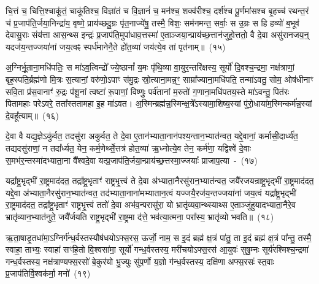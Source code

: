 {\anuvakamend[{यथ्स्वेन॑ सारस्व॒तीमा ल॑भेत॒ यः कामा॑य त्वा॒ कामो\-ऽप॒ इत्य॒भ्रो द्विच॑त्वारिꣳशच्च}]}

चि॒त्तं च॒ चित्ति॒श्चाकू॑तं॒ चाकू॑तिश्च॒ विज्ञा॑तं च वि॒ज्ञानं॑ च॒ मन॑श्च॒ शक्व॑रीश्च॒ दर्\mbox{}श॑श्च पू॒र्णमा॑सश्च बृ॒हच्च॑ रथन्त॒रं च॑ प्र॒जा\-प॑ति॒र्जया॒निन्द्रा॑य॒ वृष्णे॒ प्राय॑च्छदु॒ग्रः पृ॑त॒नाज्ये॑षु॒ तस्मै॒ विशः॒ सम॑नमन्त॒ सर्वाः॒ स उ॒ग्रः स हि हव्यो॑ ब॒भूव॑ देवासु॒राः संय॑त्ता आस॒न्थ्स इन्द्रः॑ प्र॒जा\-प॑ति॒मुपा॑धाव॒त्तस्मा॑ ए॒ताञ्जया॒न्प्राय॑च्छ॒त्तान॑जुहो॒त्ततो॒ वै दे॒वा असु॑रानजय॒न्॒ य\-दज॑य॒न्तज्जया॑नां जय॒त्वꣴ स्पर्ध॑मानेनै॒ते हो॑त॒व्या॑ जय॑त्ये॒व तां पृत॑नाम्॥~(१५)\ip

{\anuvakamend[{उप॒ पञ्च॑विꣳशतिश्च}]}

अ॒ग्निर्भू॒ताना॒मधि॑\-पतिः॒ स मा॑\-ऽव॒त्विन्द्रो᳚ ज्ये॒ष्ठानां᳚ य॒मः पृ॑थि॒व्या वा॒युर॒न्त\-रि॑क्षस्य॒ सूर्यो॑ दि॒वश्च॒न्द्रमा॒ नक्ष॑त्राणां॒ बृह॒स्पति॒र्ब्रह्म॑णो मि॒त्रः स॒त्यानां॒ वरु॑णो॒\-ऽपाꣳ स॑मु॒द्रः स्रो॒त्याना॒मन्न॒ꣳ॒ साम्रा᳚ज्याना॒मधि॑\-पति॒ तन्मा॑\-ऽवतु॒ सोम॒ ओष॑धीनाꣳ सवि॒ता प्र॑स॒वानाꣳ॑ रु॒द्रः प॑शू॒नां त्वष्टा॑ रू॒पाणां॒ विष्णुः॒ पर्व॑तानां म॒रुतो॑ ग॒णाना॒मधि॑पतय॒स्ते मा॑\-ऽवन्तु॒ पित॑रः पितामहाः परे\-ऽवरे॒ तता᳚स्ततामहा इ॒ह मा॑\-ऽवत। अ॒स्मिन्ब्रह्म॑न्न॒स्मिन्क्ष॒त्रे᳚\-ऽस्यामा॒शिष्य॒स्यां पु॑रो॒धाया॑\-म॒स्मिन्कर्म॑न्न॒स्यां दे॒वहू᳚त्याम्॥~(१६)\ip

{\anuvakamend[{अ॒व॒रे॒ स॒प्तद॑श च}]}

दे॒वा वै यद्य॒ज्ञे\-ऽकु॑र्वत॒ तदसु॑रा अकुर्वत॒ ते दे॒वा ए॒तान॑भ्याता॒नान॑पश्य॒न्तान॒भ्यात॑न्वत॒ यद्दे॒वानां॒ कर्मासी॒दार्ध्य॑त॒ तद्यदसु॑राणां॒ न तदा᳚र्ध्यत॒ येन॒ कर्म॒णेर्थ्से॒त्तत्र॑ होत॒व्या॑ ऋ॒ध्नोत्ये॒व तेन॒ कर्म॑णा॒ यद्विश्वे॑ दे॒वाः स॒मभ॑र॒न्तस्मा॑दभ्याता॒ना वै᳚श्वदे॒वा यत्प्र॒जा\-प॑ति॒र्जया॒न्प्राय॑च्छ॒त्तस्मा॒ज्जयाः᳚ प्राजाप॒त्या~-~(१७)\ip

यद्रा᳚ष्ट्र॒भृद्भी॑ रा॒ष्ट्रमाद॑दत॒ तद्रा᳚ष्ट्र॒भृताꣳ॑ राष्ट्रभृ॒त्त्वं ते दे॒वा अ॑भ्याता॒नैरसु॑रान॒भ्यात॑न्वत॒ जयै॑रजयन्राष्ट्र॒भृद्भी॑ रा॒ष्ट्रमाद॑दत॒ यद्दे॒वा अ॑भ्याता॒नैरसु॑रान॒भ्यात॑न्वत॒ तद॑भ्याता॒नाना॑\-मभ्यातान॒त्वं यज्जयै॒रज॑य॒न्तज्जया॑नां जय॒त्वं यद्रा᳚ष्ट्र॒भृद्भी॑ रा॒ष्ट्रमाद॑दत॒ तद्रा᳚ष्ट्र॒भृताꣳ॑ राष्ट्रभृ॒त्त्वं ततो॑ दे॒वा अभ॑व॒न्परासु॑रा॒ यो भ्रातृ॑व्यवा॒न्थ्स्याथ्स ए॒ताञ्जु॑हुयादभ्याता॒नैरे॒व भ्रातृ॑व्यान॒भ्यात॑नुते॒ जयै᳚र्जयति राष्ट्र॒भृद्भी॑ रा॒ष्ट्रमा द॑त्ते॒ भव॑त्या॒त्मना॒ परा᳚स्य॒ भ्रातृ॑व्यो भवति॥~(१८)\ip

{\anuvakamend[{प्रा॒जा॒प॒त्याः सो᳚\-ऽष्टाद॑श च}]}

ऋ॒ता॒षाडृ॒तधा॑मा॒\-ऽग्निर्ग॑न्ध॒र्वस्तस्यौष॑धयो\-ऽफ्स॒रस॒ ऊर्जो॒ नाम॒ स इ॒दं ब्रह्म॑ क्ष॒त्रं पा॑तु॒ ता इ॒दं ब्रह्म॑ क्ष॒त्रं पा᳚न्तु॒ तस्मै॒ स्वाहा॒ ताभ्यः॒ स्वाहा॑ सꣳहि॒तो वि॒श्वसा॑मा॒ सूर्यो॑ गन्ध॒र्वस्तस्य॒ मरी॑चयो\-ऽफ्स॒रस॑ आ॒युवः॑ सुषु॒म्नः सूर्य॑रश्मिश्च॒न्द्रमा॑ गन्ध॒र्वस्तस्य॒ नक्ष॑त्राण्यफ्स॒रसो॑ बे॒कुर॑यो भु॒ज्युः सु॑प॒र्णो य॒ज्ञो ग॑न्ध॒र्वस्तस्य॒ दक्षि॑णा अफ्स॒रसः॑ स्त॒वाः प्र॒जा\-प॑तिर्वि॒श्वक॑र्मा॒ मनो॑~(१९)\ip

